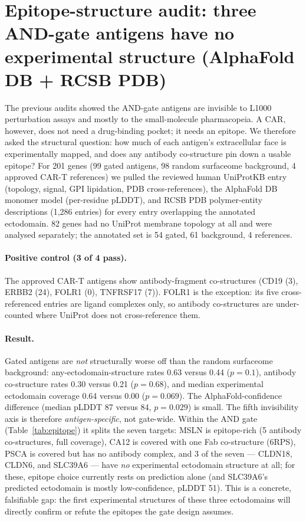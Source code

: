 \section{Epitope-structure audit: three AND-gate antigens have no experimental structure (AlphaFold DB + RCSB PDB)}
The previous audits showed the AND-gate antigens are invisible to L1000
perturbation assays and mostly to the small-molecule pharmacopeia. A CAR,
however, does not need a drug-binding pocket; it needs an epitope. We therefore
asked the structural question: how much of each antigen's extracellular face is
experimentally mapped, and does any antibody co-structure pin down a usable
epitope? For 201 genes (99 gated antigens, 98 random surfaceome background,
4 approved CAR-T references) we pulled the reviewed human UniProtKB entry
(topology, signal, GPI lipidation, PDB cross-references), the AlphaFold DB
monomer model (per-residue pLDDT), and RCSB PDB polymer-entity descriptions
(1,286 entries) for every entry overlapping the annotated ectodomain. 82
genes had no UniProt membrane topology at all and were analysed separately;
the annotated set is 54 gated, 61 background, 4 references.

\paragraph{Positive control (3 of 4 pass).} The approved CAR-T antigens show
antibody-fragment co-structures (CD19 (3), ERBB2 (24), FOLR1 (0), TNFRSF17 (7)). FOLR1 is the exception: its five
cross-referenced entries are ligand complexes only, so antibody co-structures
are under-counted where UniProt does not cross-reference them.

\paragraph{Result.} Gated antigens are \emph{not} structurally worse off than
the random surfaceome background: any-ectodomain-structure rates 0.63 versus
0.44 ($p=0.1$), antibody co-structure rates 0.30 versus 0.21 ($p=0.68$), and
median experimental ectodomain coverage 0.64 versus 0.00 ($p=0.069$). The
AlphaFold-confidence difference (median pLDDT 87 versus 84, $p=0.029$) is
small. The fifth invisibility axis is therefore \emph{antigen-specific}, not
gate-wide. Within the AND gate (Table~\ref{tab:epitope}) it splits the seven
targets: MSLN is epitope-rich (5 antibody co-structures, full coverage), CA12
is covered with one Fab co-structure (6RPS), PSCA is covered but has no
antibody complex, and 3 of the seven --- CLDN18, CLDN6, and SLC39A6 ---
have \emph{no} experimental ectodomain structure at all; for these, epitope
choice currently rests on prediction alone (and SLC39A6's predicted ectodomain
is mostly low-confidence, pLDDT 51). This is a concrete, falsifiable gap: the
first experimental structures of these three ectodomains will directly confirm
or refute the epitopes the gate design assumes.

